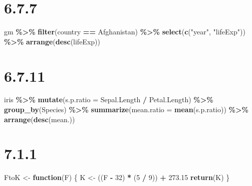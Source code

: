 \documentclass[
]{krantz}
\makeatletter
\newenvironment{Shaded}{\begin{snugshade}}{\end{snugshade}}
\newcommand{\ControlFlowTok}[1]{\textcolor[rgb]{0.27,0.27,0.27}{\textbf{#1}}}
\newcommand{\DataTypeTok}[1]{\textcolor[rgb]{0.27,0.27,0.27}{#1}}
\newcommand{\DecValTok}[1]{\textcolor[rgb]{0.06,0.06,0.06}{#1}}
\newcommand{\FloatTok}[1]{\textcolor[rgb]{0.06,0.06,0.06}{#1}}
\newcommand{\KeywordTok}[1]{\textcolor[rgb]{0.27,0.27,0.27}{\textbf{#1}}}
\newcommand{\NormalTok}[1]{#1}
\newcommand{\OperatorTok}[1]{\textcolor[rgb]{0.43,0.43,0.43}{\textbf{#1}}}
\newcommand{\StringTok}[1]{\textcolor[rgb]{0.5,0.5,0.5}{#1}}
\newenvironment{kframe}{%
\medskip{}
\setlength{\fboxsep}{.8em}
 \def\at@end@of@kframe{}%
 \ifinner\ifhmode%
  \def\at@end@of@kframe{\end{minipage}}%
  \begin{minipage}{\columnwidth}%
 \fi\fi%
 \def\FrameCommand##1{\hskip\@totalleftmargin \hskip-\fboxsep
 \colorbox{shadecolor}{##1}\hskip-\fboxsep
     \hskip-\linewidth \hskip-\@totalleftmargin \hskip\columnwidth}%
 \MakeFramed {\advance\hsize-\width
   \@totalleftmargin\z@ \linewidth\hsize
   \@setminipage}}%
 {\par\unskip\endMakeFramed%
 \at@end@of@kframe}
\renewenvironment{Shaded}{\begin{kframe}}{\end{kframe}}
\makeatother
\begin{document}
\hypertarget{section-7}{%
\section*{6.7.7}\label{section-7}}


\begin{Shaded}
\begin{Highlighting}[]
\NormalTok{gm }\OperatorTok{\%\textgreater{}\%}\StringTok{ }
\StringTok{  }\KeywordTok{filter}\NormalTok{(country }\OperatorTok{==}\StringTok{ \textquotesingle{}Afghanistan\textquotesingle{}}\NormalTok{) }\OperatorTok{\%\textgreater{}\%}\StringTok{ }
\StringTok{  }\KeywordTok{select}\NormalTok{(}\KeywordTok{c}\NormalTok{(}\StringTok{"year"}\NormalTok{, }\StringTok{"lifeExp"}\NormalTok{)) }\OperatorTok{\%\textgreater{}\%}\StringTok{ }
\StringTok{  }\KeywordTok{arrange}\NormalTok{(}\KeywordTok{desc}\NormalTok{(lifeExp))}
\end{Highlighting}
\end{Shaded}

\hypertarget{section-8}{%
\section*{6.7.11}\label{section-8}}


\begin{Shaded}
\begin{Highlighting}[]
\NormalTok{iris }\OperatorTok{\%\textgreater{}\%}\StringTok{ }
\StringTok{  }\KeywordTok{mutate}\NormalTok{(}\DataTypeTok{s.p.ratio =}\NormalTok{ Sepal.Length }\OperatorTok{/}\StringTok{ }\NormalTok{Petal.Length) }\OperatorTok{\%\textgreater{}\%}\StringTok{ }
\StringTok{  }\KeywordTok{group\_by}\NormalTok{(Species) }\OperatorTok{\%\textgreater{}\%}\StringTok{ }
\StringTok{  }\KeywordTok{summarize}\NormalTok{(}\DataTypeTok{mean.ratio =} \KeywordTok{mean}\NormalTok{(s.p.ratio)) }\OperatorTok{\%\textgreater{}\%}\StringTok{ }
\StringTok{  }\KeywordTok{arrange}\NormalTok{(}\KeywordTok{desc}\NormalTok{(mean.))}
\end{Highlighting}
\end{Shaded}

\hypertarget{section-9}{%
\section*{7.1.1}\label{section-9}}


\begin{Shaded}
\begin{Highlighting}[]
\NormalTok{FtoK \textless{}{-}}\StringTok{ }\ControlFlowTok{function}\NormalTok{(F) \{}
\NormalTok{  K \textless{}{-}}\StringTok{ }\NormalTok{((F }\OperatorTok{{-}}\StringTok{ }\DecValTok{32}\NormalTok{) }\OperatorTok{*}\StringTok{ }\NormalTok{(}\DecValTok{5} \OperatorTok{/}\StringTok{ }\DecValTok{9}\NormalTok{)) }\OperatorTok{+}\StringTok{ }\FloatTok{273.15}
  \KeywordTok{return}\NormalTok{(K)}
\NormalTok{\}}
\end{Highlighting}
\end{Shaded}
\end{document}
